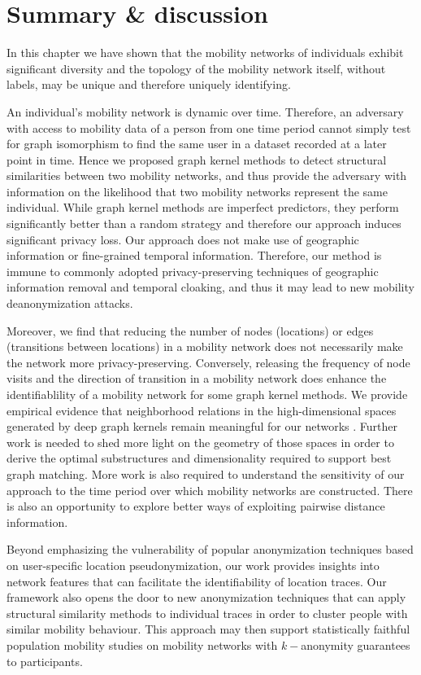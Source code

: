 \section{Summary \& discussion} %

In this chapter we have shown that the mobility networks of individuals exhibit significant diversity and the topology of the mobility network itself, without labels, may be unique and therefore uniquely identifying.

An individual's mobility network is dynamic over time.
Therefore, an adversary with access to mobility data of a person from one time period cannot simply test for graph isomorphism to find the same user in a dataset recorded at a later point in time.
Hence we proposed graph kernel methods to detect structural similarities between two mobility networks, and thus provide the adversary with information on the likelihood that two mobility networks represent the same individual.
While graph kernel methods are imperfect predictors, they perform significantly better than a random strategy and therefore our approach induces significant privacy loss.
Our approach does not make use of geographic information or fine-grained temporal information. Therefore, our method is immune to commonly adopted privacy-preserving techniques of geographic information removal and temporal cloaking, and thus it may lead to new mobility deanonymization attacks.

Moreover, we find that reducing the number of nodes (locations) or edges (transitions between locations) in a mobility network does not necessarily make the network more privacy-preserving.
Conversely, releasing the frequency of node visits and the direction of transition in a mobility network does enhance the identifiablility of a mobility network for some graph kernel methods.
We provide empirical evidence that neighborhood relations in the high-dimensional spaces generated by deep graph kernels remain meaningful for our networks \cite{Beyer}.
Further work is needed to shed more light on the geometry of those spaces in order to derive the optimal substructures and dimensionality required to support best graph matching.
More work is also required to understand the sensitivity of our approach to the time period over which mobility networks are constructed.
There is also an opportunity to explore better ways of exploiting pairwise distance information.

Beyond emphasizing the vulnerability of popular anonymization techniques based on user-specific location pseudonymization, our work provides insights into network features that can facilitate the identifiability of location traces.
Our framework also opens the door to new anonymization techniques that can apply structural similarity methods to individual traces in order to cluster people with similar mobility behaviour.
This approach may then support statistically faithful population mobility studies on mobility networks with $k-$anonymity guarantees to participants.

